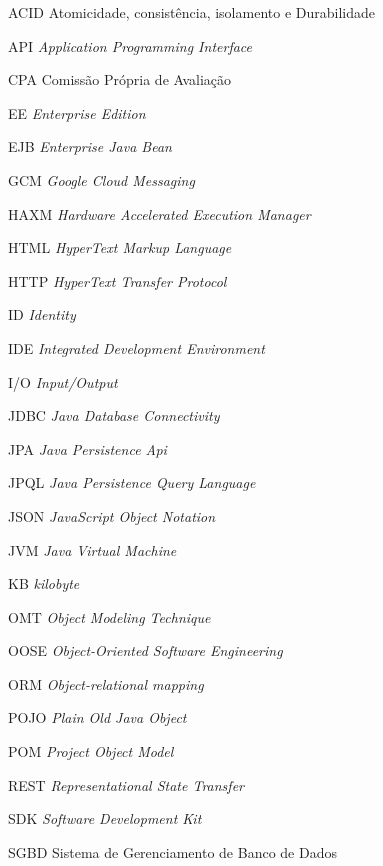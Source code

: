 
\begin{SingleSpace}

	\begin{siglas}
		
		\item[ACID] Atomicidade, consistência, isolamento e Durabilidade
		\item[API] \textit{Application Programming Interface}
		\item[CPA] Comissão Própria de Avaliação
		\item[EE]	\textit{Enterprise Edition}
		\item[EJB]	\textit{Enterprise Java Bean}
		\item[GCM] \textit{Google Cloud Messaging}
		\item[HAXM] \textit{Hardware Accelerated Execution Manager}
		\item[HTML] \textit{HyperText Markup Language}
		\item[HTTP] \textit{HyperText Transfer Protocol}
		\item[ID] \textit{Identity}
		\item[IDE] \textit{Integrated Development Environment}
		\item[I/O] \textit{Input/Output}
		\item[JDBC] \textit{Java Database Connectivity}
		\item[JPA] \textit{Java Persistence Api}
		\item[JPQL] \textit{Java Persistence Query Language}
		\item[JSON] \textit{JavaScript Object Notation}
		\item[JVM] \textit{Java Virtual Machine} 
		\item[KB]	\textit{kilobyte}
		\item[OMT] \textit{Object Modeling Technique}
		\item[OOSE] \textit{Object-Oriented Software Engineering}
		\item[ORM] \textit{Object-relational mapping}
		\item[POJO] \textit{Plain Old Java Object}
		\item[POM] \textit{Project Object Model}
		\item[REST] \textit{Representational State Transfer}
		\item[SDK] \textit{Software Development Kit}
		\item[SGBD] Sistema de Gerenciamento de Banco de Dados

\end{siglas}
\end{SingleSpace}
